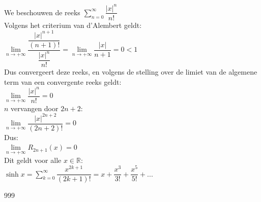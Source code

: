 \documentclass[a4paper]{article}
\begin{document}
We beschouwen de reeks $\displaystyle\sum_{n=0}^{\infty} \dfrac{|x|^{n}}{n!}$\\

Volgens het criterium van d'Alembert geldt:\\

$\lim\limits_{n \to +\infty} \dfrac{\dfrac{|x|^{n+1}}{(n+1)!}}{\dfrac{|x|^{n}}{n!}}= \lim\limits_{n \to +\infty} \dfrac{|x|}{n+1} = 0 < 1$\\

Dus convergeert deze reeks, en volgens de stelling over de limiet van de algemene term van een convergente reeks geldt:\\

$\lim\limits_{n \to +\infty} \dfrac{|x|^{n}}{n!} = 0$\\

$n$ vervangen door $2n+2$:\\

$\lim\limits_{n \to +\infty} \dfrac{|x|^{2n+2}}{(2n+2)!} = 0$\\

Dus:\\

$\lim\limits_{n \to +\infty} R_{2n+1}(x) = 0$\\

Dit geldt voor alle $x \in \mathbb{R}$:\\

$\sinh x = \displaystyle\sum_{k=0}^{\infty} \dfrac{x^{2k+1}}{(2k+1)!} = x + \dfrac{x^3}{3!} + \dfrac{x^5}{5!} + ...$\\

\begin{thebibliography}{999}
\end{thebibliography}
\end{document}
